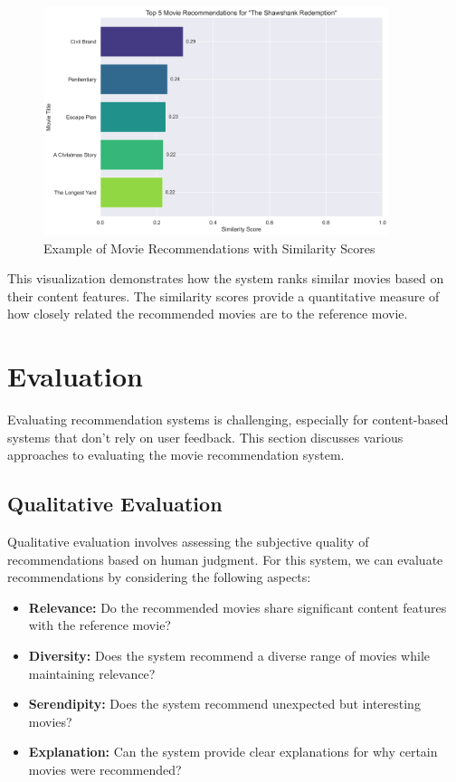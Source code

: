 \documentclass[12pt,a4paper]{article}
\begin{document}
\begin{figure}[H]
    \centering
    \includegraphics[width=0.9\textwidth]{static/visualizations/recommendation_example.png}
    \caption{Example of Movie Recommendations with Similarity Scores}
    \label{fig:recommendation_example}
\end{figure}

This visualization demonstrates how the system ranks similar movies based on their content features. The similarity scores provide a quantitative measure of how closely related the recommended movies are to the reference movie.

\section{Evaluation}

Evaluating recommendation systems is challenging, especially for content-based systems that don't rely on user feedback. This section discusses various approaches to evaluating the movie recommendation system.

\subsection{Qualitative Evaluation}

Qualitative evaluation involves assessing the subjective quality of recommendations based on human judgment. For this system, we can evaluate recommendations by considering the following aspects:

\begin{itemize}
    \item \textbf{Relevance:} Do the recommended movies share significant content features with the reference movie?
    \item \textbf{Diversity:} Does the system recommend a diverse range of movies while maintaining relevance?
    \item \textbf{Serendipity:} Does the system recommend unexpected but interesting movies?
    \item \textbf{Explanation:} Can the system provide clear explanations for why certain movies were recommended?
\end{itemize}
\end{document}
